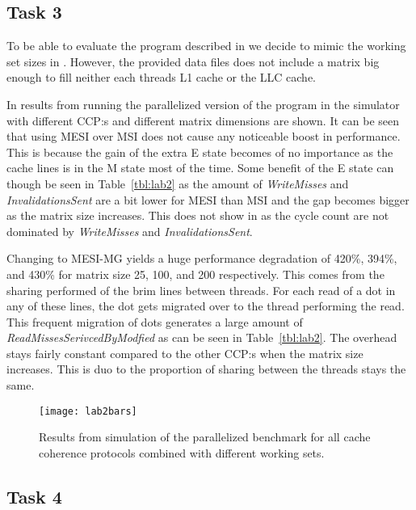 \subsection{Task 3}
To be able to evaluate the program described in  we decide to mimic the working set sizes in . However, the provided data files does not include a matrix big enough to fill neither each threads L1 cache or the LLC cache.

In  results from running the parallelized version of the program in the simulator with different CCP:s and different matrix dimensions are shown. It can be seen that using MESI over MSI does not cause any noticeable boost in performance. This is because the gain of the extra E state becomes of no importance as the cache lines is in the M state most of the time. Some benefit of the E state can though be seen in Table~\ref{tbl:lab2} as the amount of \textit{WriteMisses} and \textit{InvalidationsSent} are a bit lower for MESI than MSI and the gap becomes bigger as the matrix size increases. This does not show in  as the cycle count are not dominated by \textit{WriteMisses} and \textit{InvalidationsSent}.

Changing to MESI-MG yields a huge performance degradation of 420\%, 394\%, and 430\% for matrix size 25, 100, and 200 respectively. This comes from the sharing performed of the brim lines between threads. For each read of a dot in any of these lines, the dot gets migrated over to the thread performing the read. This frequent migration of dots generates a large amount of \textit{ReadMissesSerivcedByModfied} as can be seen in Table~\ref{tbl:lab2}. The overhead stays fairly constant compared to the other CCP:s when the matrix size increases. This is duo to the proportion of sharing between the threads stays the same.  

\begin{figure}[t]
	\center
	\texttt{[image: lab2bars]}
	\caption{Results from simulation of the parallelized benchmark for all cache coherence protocols combined with different working sets.}
	\label{fig:lab2}
\end{figure}

\subsection{Task 4}

